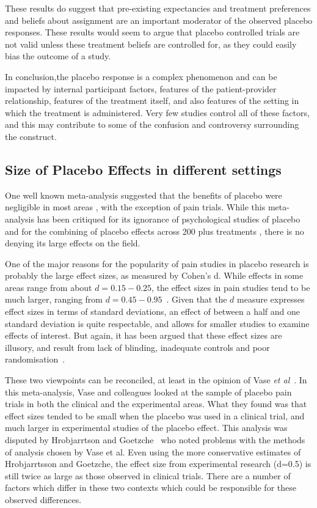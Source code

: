 These results do suggest that pre-existing expectancies and treatment preferences and beliefs about assignment are an important moderator of the observed placebo responses. These results would seem to argue that placebo controlled trials are not valid unless these treatment beliefs are controlled for, as they could easily bias the outcome of a study. 


In conclusion,the placebo response is a complex phenomenon and can be impacted by internal  participant factors, features of the patient-provider relationship, features of the treatment itself, and also features of the setting in which the treatment is administered. Very few studies control all of these factors, and this may contribute to some of the confusion and controversy surrounding the construct. 

\subsection{Size of Placebo Effects in different settings}

One well known meta-analysis suggested that the benefits of placebo were negligible in most areas \cite{hrobjartsson2001}, with the exception of pain trials. While this meta-analysis has been critiqued for its ignorance of psychological studies of placebo \cite{Evans2003, Stewart-Williams2004b}  and for the combining of placebo effects across 200 plus treatments \cite{Wickramasekera2001}, there is no denying its large effects on the field. 

One of the major reasons for the popularity of pain studies in placebo research is probably the large effect sizes, as measured by Cohen's d. While effects in some areas range from about $d=0.15-0.25$, the effect sizes in pain studies tend to be much larger, ranging from $d=0.45-0.95$~\cite{Vase2002}. Given that the $d$ measure  expresses effect sizes in terms of standard deviations, an effect of between a half and one standard deviation is quite respectable, and allows for smaller studies to examine effects of interest.  But again, it has been argued that these effect sizes are illusory, and result from lack of blinding, inadequate controls and poor randomisation~\cite{hrobjartsson2003,Kienle1997}. 

These two viewpoints can be reconciled, at least in the opinion of Vase \textit{et al}~\cite{Vase2002}. In this meta-analysis, Vase and colleagues looked at the sample of placebo pain trials in both the clinical  and  the experimental areas. What they found was that effect sizes tended to be small when the placebo was used in a clinical trial, and much larger in experimental studies of the placebo effect. This analysis was disputed by Hrobjarrtson and Goetzche~\cite{hrobjartsson2003} who noted problems with the methods of analysis chosen by Vase et al. Even using the more conservative estimates of Hrobjarrtsson and Goetzche, the effect size from experimental research (d=0.5) is still twice as large as those observed in clinical trials. There are a number of factors which differ in these two contexts which could be responsible for these observed differences.  



